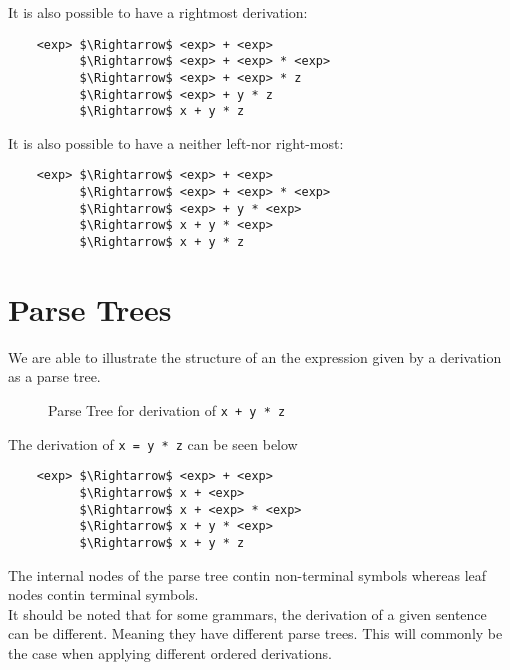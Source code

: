 It is also possible to have a rightmost derivation:
\begin{lstlisting}
    <exp> $\Rightarrow$ <exp> + <exp>
          $\Rightarrow$ <exp> + <exp> * <exp>
          $\Rightarrow$ <exp> + <exp> * z
          $\Rightarrow$ <exp> + y * z
          $\Rightarrow$ x + y * z
\end{lstlisting}

It is also possible to have a neither left-nor right-most:
\begin{lstlisting}
    <exp> $\Rightarrow$ <exp> + <exp>
          $\Rightarrow$ <exp> + <exp> * <exp>
          $\Rightarrow$ <exp> + y * <exp>
          $\Rightarrow$ x + y * <exp>
          $\Rightarrow$ x + y * z
\end{lstlisting}

\section{Parse Trees}
We are able to illustrate the structure of an the expression given by a derivation as a parse tree.
\begin{figure}[H]
\centering
{}
\caption{Parse Tree for derivation of \texttt{x + y * z}}
\end{figure}

The derivation of \verb|x = y * z| can be seen below
\begin{lstlisting}
    <exp> $\Rightarrow$ <exp> + <exp>
          $\Rightarrow$ x + <exp>
          $\Rightarrow$ x + <exp> * <exp>
          $\Rightarrow$ x + y * <exp>
          $\Rightarrow$ x + y * z
\end{lstlisting}

The internal nodes of the parse tree contin non-terminal symbols whereas leaf nodes contin terminal symbols. \\

It should be noted that for some grammars, the derivation of a given sentence can be different. Meaning they have different parse trees. This will commonly be the case when applying different ordered derivations.